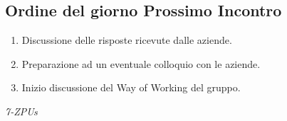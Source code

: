 \documentclass[a4paper,12pt]{article}
\begin{document}
\subsection{Ordine del giorno Prossimo Incontro}
\begin{enumerate}
    \item Discussione delle risposte ricevute dalle aziende.
    \item Preparazione ad un eventuale colloquio con le aziende.
    \item Inizio discussione del Way of Working del gruppo.
\end{enumerate}

\vfill
\begin{flushright}
    \textit{7-ZPUs}
\end{flushright}
\end{document}
